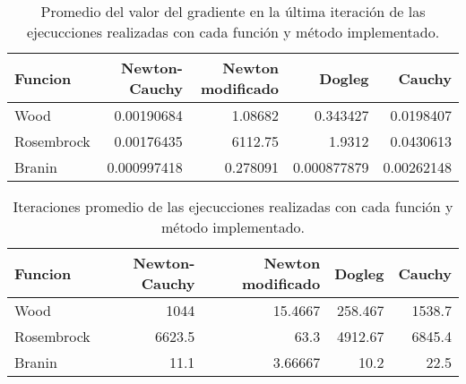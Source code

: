 \begin{table}[H]
    \centering
    \begin{tabular}{lrrrr}
        \hline
        \textbf{Funcion} & \textbf{Newton-Cauchy} & \textbf{Newton modificado} & \textbf{Dogleg} & \textbf{Cauchy} \\ \hline
        Wood             & 0.00190684             & 1.08682                    & 0.343427        & 0.0198407       \\
        Rosembrock       & 0.00176435             & 6112.75                    & 1.9312          & 0.0430613       \\
        Branin           & 0.000997418            & 0.278091                   & 0.000877879     & 0.00262148      \\
        \hline
    \end{tabular}
    \caption{Promedio del valor del gradiente en la última iteración de las ejecucciones realizadas con cada función y método implementado.}
    \label{table:gradient}
\end{table}

\begin{table}[H]
    \centering
    \begin{tabular}{lrrrr}
        \hline
        \textbf{Funcion} & \textbf{Newton-Cauchy} & \textbf{Newton modificado} & \textbf{Dogleg} & \textbf{Cauchy} \\
        \hline
        Wood             & 1044                   & 15.4667                    & 258.467         & 1538.7          \\
        Rosembrock       & 6623.5                 & 63.3                       & 4912.67         & 6845.4          \\
        Branin           & 11.1                   & 3.66667                    & 10.2            & 22.5            \\
        \hline
    \end{tabular}
    \caption{Iteraciones promedio de las ejecucciones realizadas con cada función y método implementado.}
    \label{table:iterations}
\end{table}